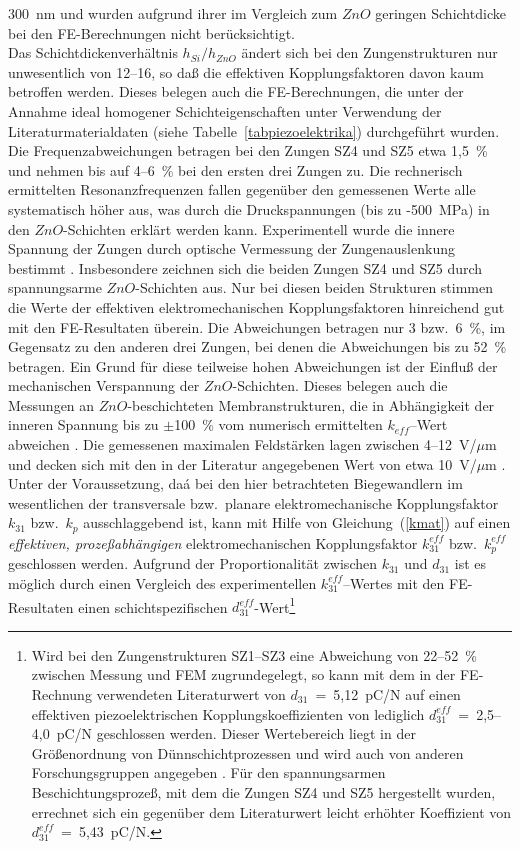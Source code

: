 300~nm und wurden aufgrund ihrer im Vergleich zum $ZnO$ geringen Schichtdicke
bei den FE-Berechnungen nicht berücksichtigt.\\
%
Das Schichtdickenverhältnis $h_{Si}/h_{ZnO}$ ändert sich bei den
Zungenstrukturen nur unwesentlich von  12--16, so daß die effektiven
Kopplungsfaktoren davon kaum betroffen werden. Dieses belegen auch die
FE-Berechnungen, die unter der Annahme ideal homogener Schichteigenschaften
unter Verwendung der Literaturmaterialdaten (siehe
Tabelle~\ref{tabpiezoelektrika}) durchgeführt wurden.
Die Frequenzabweichungen betragen bei den Zungen SZ4 und SZ5 etwa 1,5~\%
und nehmen bis auf 4--6~\% bei den ersten drei Zungen zu.
Die rechnerisch ermittelten Resonanzfrequenzen fallen gegenüber den
gemessenen Werte alle systematisch höher aus, was durch die Druckspannungen
(bis zu -500~MPa) in den $ZnO$-Schichten erklärt werden kann. Experimentell
wurde die innere Spannung der Zungen durch optische Vermessung der
Zungenauslenkung bestimmt \cite{Flik}. Insbesondere zeichnen sich die
beiden Zungen SZ4 und SZ5 durch spannungsarme $ZnO$-Schichten aus.
Nur bei diesen beiden Strukturen stimmen die Werte der effektiven
elektromechanischen Kopplungsfaktoren hinreichend gut mit den FE-Resultaten
überein. Die Abweichungen betragen nur 3 bzw.\ 6~\%, im Gegensatz zu den
anderen drei Zungen, bei denen die Abweichungen bis zu 52~\% betragen.
Ein Grund für diese teilweise hohen Abweichungen ist der Einfluß der
mechanischen Verspannung der $ZnO$-Schichten.
Dieses belegen auch die Messungen an $ZnO$-beschichteten Membranstrukturen,
die in Abhängigkeit der inneren Spannung bis zu $\pm$100~\% vom numerisch
ermittelten $k_{eff}$--Wert abweichen \cite{ABV93}.
Die gemessenen maximalen Feldstärken lagen zwischen 4--12~V/$\mu$m und
decken sich mit den in der Literatur angegebenen Wert von etwa 10~V/$\mu$m
\cite{Smi92b}.\\
%
Unter der Voraussetzung, daá bei den hier betrachteten Biegewandlern
im wesentlichen der transversale bzw.\ planare elektromechanische
Kopplungsfaktor $k_{31}$ bzw.\ $k_{p}$ ausschlaggebend ist,
kann mit Hilfe von Gleichung~(\ref{kmat}) auf einen {\em effektiven,
prozeßabhängigen} elektromechanischen Kopplungsfaktor $k_{31}^{eff}$ bzw.\
$k_{p}^{eff}$ geschlossen werden. Aufgrund der Proportionalität zwischen
$k_{31}$ und $d_{31}$ ist es möglich durch einen Vergleich des
experimentellen $k_{31}^{eff}$--Wertes mit den FE-Resultaten einen
schichtspezifischen
$d^{eff}_{31}$-Wert\footnote{Wird bei den Zungenstrukturen SZ1--SZ3 eine
Abweichung von 22--52~\% zwischen Messung und FEM zugrundegelegt, so kann
mit dem in der FE-Rechnung verwendeten Literaturwert von
$d_{31}$~=~5,12~pC/N auf einen effektiven piezoelektrischen
Kopplungskoeffizienten von lediglich $d^{eff}_{31}$~=~2,5--4,0~pC/N
geschlossen werden. Dieser Wertebereich liegt in der Größenordnung von
Dünnschichtprozessen und wird auch von anderen Forschungsgruppen angegeben
\cite{Pra93}. Für den spannungsarmen Beschichtungsprozeß, mit dem die
Zungen SZ4 und SZ5 hergestellt wurden, errechnet sich ein gegenüber dem
Literaturwert leicht erhöhter Koeffizient von $d^{eff}_{31}$~=~5,43~pC/N.}
